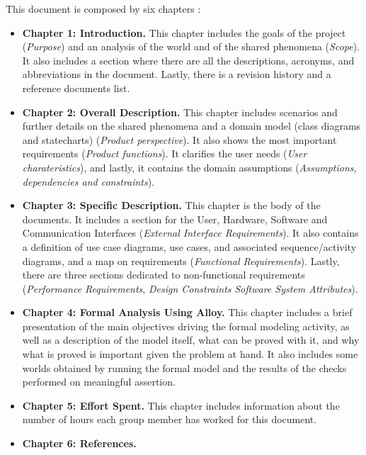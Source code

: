 This document is composed by six chapters :
\begin{itemize}
    \item \textbf{Chapter 1: Introduction.} This chapter includes the goals of the project (\textit{Purpose}) 
    and an analysis of the world and of the shared phenomena (\textit{Scope}). It also includes a section where 
    there are all the descriptions, acronyms, and abbreviations in the document. Lastly, there 
    is a revision history and a reference documents list.
    \item \textbf{Chapter 2: Overall Description.} This chapter includes scenarios and further
    details on the shared phenomena and a domain model (class diagrams and statecharts) (\textit{Product perspective}). It also
    shows the most important requirements (\textit{Product functions}). It clarifies the user needs (\textit{User charateristics}), and lastly, it contains 
    the domain assumptions (\textit{Assumptions, dependencies and constraints}).
    \item \textbf{Chapter 3: Specific Description.} This chapter is the body of the documents. It includes a section for 
    the User, Hardware, Software and Communication Interfaces (\textit{External Interface Requirements}). It also contains a definition
    of use case diagrams, use cases, and associated sequence/activity diagrams, and a map on requirements (\textit{Functional Requirements}).
    Lastly, there are three sections dedicated to non-functional requirements (\textit{Performance Requirements}, \textit{Design Constraints} \textit{Software System Attributes}).
    \item \textbf{Chapter 4: Formal Analysis Using Alloy.} This chapter includes a brief presentation of the
    main objectives driving the formal modeling activity, as well as a description of the model
    itself, what can be proved with it, and why what is proved is important given the problem at hand. It also includes some worlds obtained by running the
    formal model and the results of the checks performed on meaningful assertion.
    \item \textbf{Chapter 5: Effort Spent.}  This chapter includes information about the number of hours each group member has worked for this document.    
    \item \textbf{Chapter 6: References.}
\end{itemize}